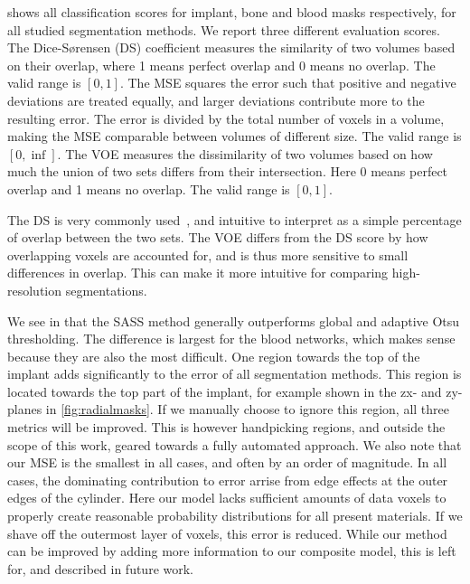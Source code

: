  shows all classification scores for implant, bone and blood
masks respectively, for all studied segmentation methods. We report three
different evaluation scores. The Dice-Sørensen (DS) coefficient measures the
similarity of two volumes based on their overlap, where 1 means perfect overlap
and 0 means no overlap. The valid range is $[0,1]$. The MSE squares the error
such that positive and negative deviations are treated equally, and larger
deviations contribute more to the resulting error. The error is divided by the
total number of voxels in a volume, making the MSE comparable between volumes
of different size.  The valid range is $[0,\inf]$. The VOE measures the
dissimilarity of two volumes based on how much the union of two sets differs
from their intersection. Here 0 means perfect overlap and 1 means no overlap.
The valid range is $[0,1]$.

The DS is very commonly used~\cite{evaluation_review}, and intuitive to
interpret as a simple percentage of overlap between the two sets. The VOE
differs from the DS score by how overlapping voxels are accounted for, and is
thus more sensitive to small differences in overlap. This can make it more
intuitive for comparing high-resolution segmentations.

We see in  that the SASS method generally outperforms global
and adaptive Otsu thresholding. The difference is largest for the blood
networks, which makes sense because they are also the most difficult. One
region towards the top of the implant adds significantly to the error of all
segmentation methods. This region is located towards the top part of the
implant, for example shown in the zx- and zy-planes in \cref{fig:radialmasks}.
If we manually choose to ignore this region, all three metrics will be
improved. This is however handpicking regions, and outside the scope of this
work, geared towards a fully automated approach. We also note that our MSE is
the smallest in all cases, and often by an order of magnitude. In all cases,
the dominating contribution to error arrise from edge effects at the outer
edges of the cylinder. Here our model lacks sufficient amounts of data voxels
to properly create reasonable probability distributions for all present
materials. If we shave off the outermost layer of voxels, this error is
reduced. While our method can be improved by adding more information to our
composite model, this is left for, and described in future work.



